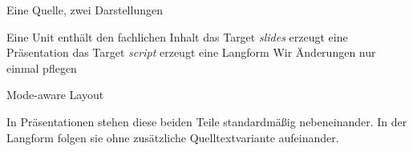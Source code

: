 \documentclass{osglecture}
\begin{document}

\begin{seriessection}{Eine Quelle, zwei Darstellungen}
  \label{sec:shared-source}
  \begin{presitemize}
    \item Eine Unit enthält den fachlichen Inhalt
    \anditem das Target \emph{slides} erzeugt eine Präsentation
    \anditem das Target \emph{script} erzeugt eine Langform
    \thereforeitem Wir  Änderungen nur einmal pflegen
  \end{presitemize}
\end{seriessection}

\begin{seriessection}{Mode-aware Layout}
  \begin{twocolumns}[t,.46]
    In Präsentationen stehen diese beiden Teile standardmäßig nebeneinander.
    \nextcolumn
    In der Langform folgen sie ohne zusätzliche Quelltextvariante aufeinander.
  \end{twocolumns}
\end{seriessection}
\end{document}
